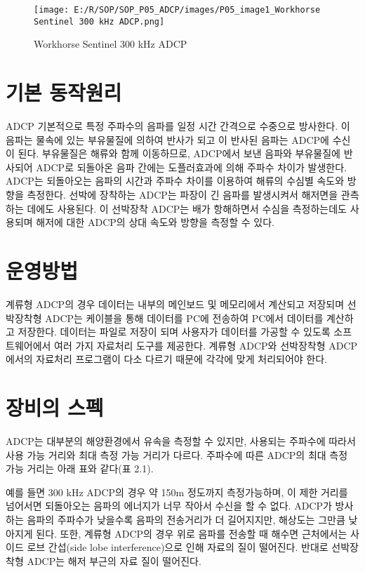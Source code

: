 \documentclass[
]{book}
\begin{document}
\begin{figure}
\centering
\texttt{[image: E:/R/SOP/SOP\_P05\_ADCP/images/P05\_image1\_Workhorse Sentinel 300 kHz ADCP.png]}
\caption{Workhorse Sentinel 300 kHz ADCP}
\end{figure}

\hypertarget{uxae30uxbcf8-uxb3d9uxc791uxc6d0uxb9ac-1}{%
\section{기본 동작원리}\label{uxae30uxbcf8-uxb3d9uxc791uxc6d0uxb9ac-1}}

ADCP 기본적으로 특정 주파수의 음파를 일정 시간 간격으로 수중으로 방사한다. 이 음파는 물속에 있는 부유물질에 의하여 반사가 되고 이 반사된 음파는 ADCP에 수신이 된다. 부유물질은 해류와 함께 이동하므로, ADCP에서 보낸 음파와 부유물질에 반사되어 ADCP로 되돌아온 음파 간에는 도플러효과에 의해 주파수 차이가 발생한다. ADCP는 되돌아오는 음파의 시간과 주파수 차이를 이용하여 해류의 수심별 속도와 방향을 측정한다. 선박에 장착하는 ADCP는 파장이 긴 음파를 발생시켜서 해저면을 관측 하는 데에도 사용된다. 이 선박장착 ADCP는 배가 항해하면서 수심을 측정하는데도 사용되며 해저에 대한 ADCP의 상대 속도와 방향을 측정할 수 있다.

\hypertarget{uxc6b4uxc601uxbc29uxbc95}{%
\section{운영방법}\label{uxc6b4uxc601uxbc29uxbc95}}

계류형 ADCP의 경우 데이터는 내부의 메인보드 및 메모리에서 계산되고 저장되며 선박장착형 ADCP는 케이블을 통해 데이터를 PC에 전송하여 PC에서 데이터를 계산하고 저장한다. 데이터는 파일로 저장이 되며 사용자가 데이터를 가공할 수 있도록 소프트웨어에서 여러 가지 자료처리 도구를 제공한다. 계류형 ADCP와 선박장착형 ADCP에서의 자료처리 프로그램이 다소 다르기 때문에 각각에 맞게 처리되어야 한다.

\hypertarget{uxc7a5uxbe44uxc758-uxc2a4uxd399}{%
\section{장비의 스펙}\label{uxc7a5uxbe44uxc758-uxc2a4uxd399}}

ADCP는 대부분의 해양환경에서 유속을 측정할 수 있지만, 사용되는 주파수에 따라서 사용 가능 거리와 최대 측정 가능 거리가 다르다. 주파수에 따른 ADCP의 최대 측정 가능 거리는 아래 표와 같다(표 2.1).

예를 들면 300 kHz ADCP의 경우 약 150m 정도까지 측정가능하며, 이 제한 거리를 넘어서면 되돌아오는 음파의 에너지가 너무 작아서 수신을 할 수 없다. ADCP가 방사하는 음파의 주파수가 낮을수록 음파의 전송거리가 더 길어지지만, 해상도는 그만큼 낮아지게 된다. 또한, 계류형 ADCP의 경우 위로 음파를 전송할 때 해수면 근처에서는 사이드 로브 간섭(side lobe interference)으로 인해 자료의 질이 떨어진다. 반대로 선박장착형 ADCP는 해저 부근의 자료 질이 떨어진다.
\end{document}
